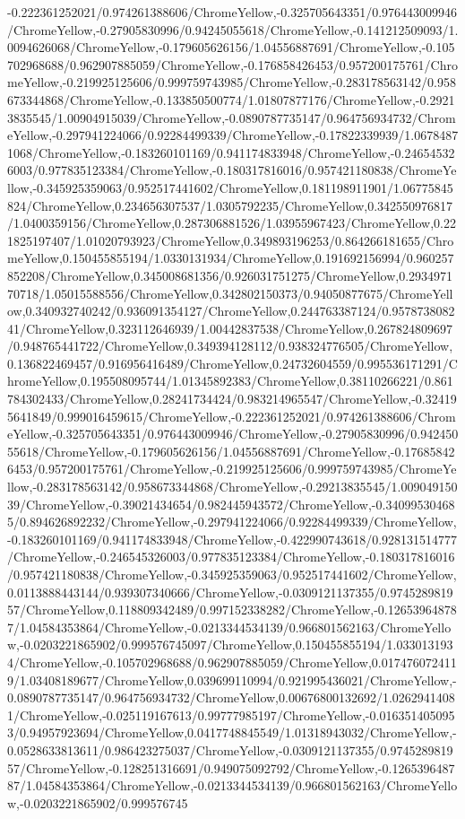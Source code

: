 {\begin{tikzternal}
{-0.222361252021/0.974261388606/ChromeYellow,-0.325705643351/0.976443009946/ChromeYellow,-0.27905830996/0.94245055618/ChromeYellow,-0.141212509093/1.0094626068/ChromeYellow,-0.179605626156/1.04556887691/ChromeYellow,-0.105702968688/0.962907885059/ChromeYellow,-0.176858426453/0.957200175761/ChromeYellow,-0.219925125606/0.999759743985/ChromeYellow,-0.283178563142/0.958673344868/ChromeYellow,-0.133850500774/1.01807877176/ChromeYellow,-0.29213835545/1.00904915039/ChromeYellow,-0.0890787735147/0.964756934732/ChromeYellow,-0.297941224066/0.92284499339/ChromeYellow,-0.17822339939/1.06784871068/ChromeYellow,-0.183260101169/0.941174833948/ChromeYellow,-0.246545326003/0.977835123384/ChromeYellow,-0.180317816016/0.957421180838/ChromeYellow,-0.345925359063/0.952517441602/ChromeYellow,0.181198911901/1.06775845824/ChromeYellow,0.234656307537/1.0305792235/ChromeYellow,0.342550976817/1.0400359156/ChromeYellow,0.287306881526/1.03955967423/ChromeYellow,0.221825197407/1.01020793923/ChromeYellow,0.349893196253/0.864266181655/ChromeYellow,0.150455855194/1.0330131934/ChromeYellow,0.191692156994/0.960257852208/ChromeYellow,0.345008681356/0.926031751275/ChromeYellow,0.293497170718/1.05015588556/ChromeYellow,0.342802150373/0.94050877675/ChromeYellow,0.340932740242/0.936091354127/ChromeYellow,0.244763387124/0.957873808241/ChromeYellow,0.323112646939/1.00442837538/ChromeYellow,0.267824809697/0.948765441722/ChromeYellow,0.349394128112/0.938324776505/ChromeYellow,0.136822469457/0.916956416489/ChromeYellow,0.24732604559/0.995536171291/ChromeYellow,0.195508095744/1.01345892383/ChromeYellow,0.38110266221/0.861784302433/ChromeYellow,0.28241734424/0.983214965547/ChromeYellow,-0.324195641849/0.999016459615/ChromeYellow,-0.222361252021/0.974261388606/ChromeYellow,-0.325705643351/0.976443009946/ChromeYellow,-0.27905830996/0.94245055618/ChromeYellow,-0.179605626156/1.04556887691/ChromeYellow,-0.176858426453/0.957200175761/ChromeYellow,-0.219925125606/0.999759743985/ChromeYellow,-0.283178563142/0.958673344868/ChromeYellow,-0.29213835545/1.00904915039/ChromeYellow,-0.39021434654/0.982445943572/ChromeYellow,-0.340995304685/0.894626892232/ChromeYellow,-0.297941224066/0.92284499339/ChromeYellow,-0.183260101169/0.941174833948/ChromeYellow,-0.422990743618/0.928131514777/ChromeYellow,-0.246545326003/0.977835123384/ChromeYellow,-0.180317816016/0.957421180838/ChromeYellow,-0.345925359063/0.952517441602/ChromeYellow,0.0113888443144/0.939307340666/ChromeYellow,-0.0309121137355/0.974528981957/ChromeYellow,0.118809342489/0.997152338282/ChromeYellow,-0.126539648787/1.04584353864/ChromeYellow,-0.0213344534139/0.966801562163/ChromeYellow,-0.0203221865902/0.999576745097/ChromeYellow,0.150455855194/1.0330131934/ChromeYellow,-0.105702968688/0.962907885059/ChromeYellow,0.0174760724119/1.03408189677/ChromeYellow,0.039699110994/0.921995436021/ChromeYellow,-0.0890787735147/0.964756934732/ChromeYellow,0.00676800132692/1.02629414081/ChromeYellow,-0.025119167613/0.99777985197/ChromeYellow,-0.0163514050953/0.94957923694/ChromeYellow,0.0417748845549/1.01318943032/ChromeYellow,-0.0528633813611/0.986423275037/ChromeYellow,-0.0309121137355/0.974528981957/ChromeYellow,-0.128251316691/0.949075092792/ChromeYellow,-0.126539648787/1.04584353864/ChromeYellow,-0.0213344534139/0.966801562163/ChromeYellow,-0.0203221865902/0.999576745}
\end{tikzternal}}
